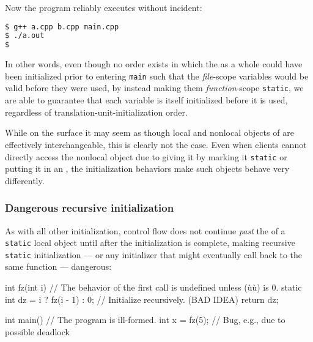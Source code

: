 \noindent Now the program reliably executes without incident:

\begin{lstlisting}[language=bash]
$ g++ a.cpp b.cpp main.cpp
$ ./a.out
$
\end{lstlisting}

\noindent In other words, even though no order exists in which the 
as a whole could have been initialized prior to entering
\lstinline!main! such that the \emph{file}-scope variables
would be valid before they were used, by instead making them
\emph{function}-scope \lstinline!static!, we are able to guarantee that
each variable is itself initialized before it is used, regardless of
translation-unit-initialization order.

While on the surface it may seem as though local and nonlocal objects of 
are effectively interchangeable, this is clearly not the case.  Even when
clients cannot directly access the nonlocal object due to giving it
 by marking it \lstinline!static! or putting it in an ,
the initialization behaviors make such objects behave very differently.

\subsubsection[Dangerous recursive initialization]{Dangerous recursive initialization}\label{dangerous-recursive-initialization}

As with all other initialization, control flow does not continue
\emph{past} the  of a \lstinline!static! local object until
after the initialization is complete, making recursive \lstinline!static!
initialization --- or any initializer that might eventually call back to the same function --- dangerous:

\begin{emcppslisting}
int fz(int i)  // The behavior of the first call is undefined unless (ù{}ù) is 0.
{
    static int dz = i ? fz(i - 1) : 0;  // Initialize recursively. (BAD IDEA)
    return dz;
}

int main()  // The program is ill-formed.
{
    int x = fz(5);  // Bug, e.g., due to possible deadlock
}
\end{emcppslisting}

